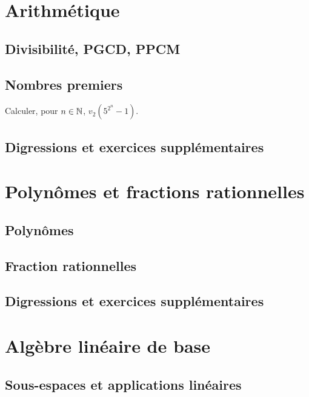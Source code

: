 \documentclass[12pt,a4paper]{exo_book}
\begin{document}
\chapter{Arithmétique}

\section{Divisibilité, PGCD, PPCM}

\section{Nombres premiers}

\begin{exo}
    Calculer, pour $n \in \mathbb{N}$, $v_2(5^{2^n} - 1)$.
\end{exo}

\section{Digressions et exercices supplémentaires}


\chapter{Polynômes et fractions rationnelles}

\section{Polynômes}

\section{Fraction rationnelles}

\section{Digressions et exercices supplémentaires}

\chapter{Algèbre linéaire de base}

\section{Sous-espaces et applications linéaires}
\end{document}
